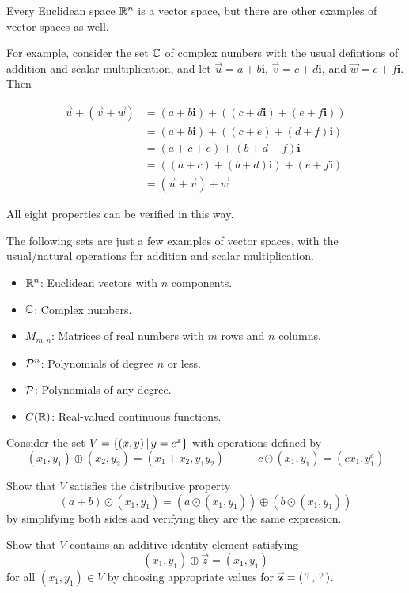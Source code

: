 \begin{remark}
  Every Euclidean space \(\IR^n\) is a vector space, but there are other
  examples of vector spaces as well. 

  \vspace{1em}
  
  For example, consider the
  set \(\IC\) of complex numbers with the usual defintions of
  addition and scalar multiplication, and let 
  \(\vec u=a+b\mathbf{i}\), \(\vec v=c+d\mathbf{i}\), and \(\vec w=e+f\mathbf{i}\). Then

  \begin{align*}
    \vec u+(\vec v+\vec w)
      &=
    (a+b\mathbf{i})+((c+d\mathbf{i})+(e+f\mathbf{i}))
      \\&=
    (a+b\mathbf{i})+((c+e)+(d+f)\mathbf{i})
	\\&=(a+c+e)+(b+d+f)\mathbf{i}
    \\&=((a+c)+(b+d)\mathbf{i})+(e+f\mathbf{i})
      \\&=
    (\vec u+\vec v)+\vec w
  \end{align*}

  All eight properties can be verified in this way.
\end{remark}

\begin{remark}
  The following sets are just a few examples of vector spaces, with the usual/natural
  operations for addition and scalar multiplication.
  \begin{itemize}
    \item \(\IR^n\): Euclidean vectors with \(n\) components.
    \item \(\IC\): Complex numbers.
    \item \(M_{m,n}\): Matrices of real numbers with \(m\) rows and
          \(n\) columns.
    \item \(\P^n\): Polynomials of degree \(n\) or less.
    \item \(\P\): Polynomials of any degree.
    \item \(C(\IR)\): Real-valued continuous functions.
  \end{itemize}
\end{remark}

\begin{activity}{20}
  Consider the set \(V=\setBuilder{(x,y)}{y=e^x}\) with operations defined by
  \[
    (x_1,y_1)\oplus (x_2,y_2)=(x_1+x_2,y_1y_2)
      \hspace{3em}
    c\odot (x_1,y_1)=(cx_1,y_1^c)
  \]
  \begin{subactivity}
  Show that \(V\) satisfies the distributive property
  \[(a+b)\odot (x_1,y_1)=\left(a\odot (x_1,y_1)\right)\oplus \left(b\odot (x_1,y_1)\right)\]
  by simplifying both sides and verifying they are the same
  expression.
  \end{subactivity}
  \begin{subactivity}%
  Show that \(V\) contains an additive identity element satisfying
  \[(x_1,y_1)\oplus\vec{z}=(x_1,y_1)\]
  for all \((x_1,y_1)\in V\)
  by choosing appropriate values for \(\vec{z}=(\unknown,\unknown)\). 
  \end{subactivity}
\end{activity}


